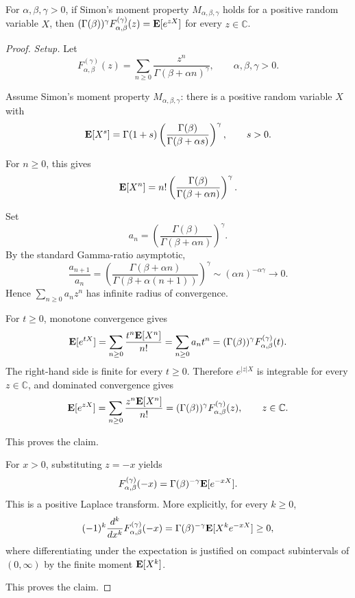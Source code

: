 \begin{lemma}
\label{res:simon-leroy-moment-property-normal-form}
For \(\alpha,\beta,\gamma>0\), if Simon's moment property \(M_{\alpha,\beta,\gamma}\) holds for a positive random variable \(X\), then \((\Gamma(\beta))^\gamma F^{(\gamma)}_{\alpha,\beta}(z)={\bf E}[e^{zX}]\) for every \(z\in\mathbb C\).
\end{lemma}
\begin{proof}
\emph{Setup.}
Let
\[
F^{(\gamma)}_{\alpha,\beta}(z)
=\sum_{n\ge0}\frac{z^n}{\Gamma(\beta+\alpha n)^\gamma},
\qquad \alpha,\beta,\gamma>0.
\]

Assume Simon's moment property \(M_{\alpha,\beta,\gamma}\): there is a positive random variable \(X\) with
\[
{\bf E}[X^s]
=\Gamma(1+s)\left(\frac{\Gamma(\beta)}{\Gamma(\beta+\alpha s)}\right)^\gamma,
\qquad s>0.
\]

For \(n\ge0\), this gives
\[
{\bf E}[X^n]
=n!\left(\frac{\Gamma(\beta)}{\Gamma(\beta+\alpha n)}\right)^\gamma.
\]

Set
\[
a_n=\left(\frac{\Gamma(\beta)}{\Gamma(\beta+\alpha n)}\right)^\gamma.
\]
By the standard Gamma-ratio asymptotic,
\[
\frac{a_{n+1}}{a_n}
=\left(\frac{\Gamma(\beta+\alpha n)}{\Gamma(\beta+\alpha(n+1))}\right)^\gamma
\sim (\alpha n)^{-\alpha\gamma}\to0.
\]
Hence \(\sum_{n\ge0}a_n z^n\) has infinite radius of convergence.

For \(t\ge0\), monotone convergence gives
\[
{\bf E}[e^{tX}]
=\sum_{n\ge0}\frac{t^n{\bf E}[X^n]}{n!}
=\sum_{n\ge0}a_n t^n
=(\Gamma(\beta))^\gamma F^{(\gamma)}_{\alpha,\beta}(t).
\]
The right-hand side is finite for every \(t\ge0\). Therefore \(e^{|z|X}\) is integrable for every \(z\in\mathbb C\), and dominated convergence gives
\[
{\bf E}[e^{zX}]
=\sum_{n\ge0}\frac{z^n{\bf E}[X^n]}{n!}
=(\Gamma(\beta))^\gamma F^{(\gamma)}_{\alpha,\beta}(z),
\qquad z\in\mathbb C.
\]

This proves the claim.

For \(x>0\), substituting \(z=-x\) yields
\[
F^{(\gamma)}_{\alpha,\beta}(-x)
=\Gamma(\beta)^{-\gamma}{\bf E}[e^{-xX}].
\]
This is a positive Laplace transform. More explicitly, for every \(k\ge0\),
\[
(-1)^k\frac{d^k}{dx^k}F^{(\gamma)}_{\alpha,\beta}(-x)
=\Gamma(\beta)^{-\gamma}{\bf E}[X^k e^{-xX}]\ge0,
\]
where differentiating under the expectation is justified on compact subintervals of \((0,\infty)\) by the finite moment \({\bf E}[X^k]\).

This proves the claim.
\end{proof}

